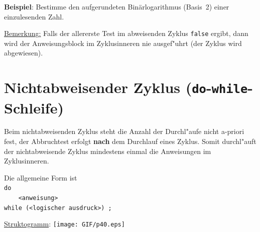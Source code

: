 \textbf{Beispiel}: Bestimme den aufgerundeten Binärlogarithmus (Basis~2)
einer einzulesenden Zahl.
%
% 


\underline{Bemerkung:} Falls der allererste Test im abweisenden Zyklus \texttt{false}
ergibt, dann wird der Anweisungsblock im Zyklusinneren
nie ausgef"uhrt (der Zyklus wird abgewiesen).

%
%
\section[Nichtabweisender Zyklus]{Nichtabweisender Zyklus (\texttt{do}-\texttt{while}-Schleife)}
\label{p:4.6}
%
Beim nichtabweisenden Zyklus steht die Anzahl der Durchl"aufe nicht
a-priori fest, der Abbruchtest erfolgt \textbf{nach} dem Durchlauf
eines Zyklus. Somit durchl"auft der nichtabweisende Zyklus mindestens
einmal die Anweisungen im Zyklusinneren.

% 
% 

\begin{minipage}[t]{0.5\textwidth}
Die allgemeine Form ist\\[1ex]
\phantom{XXX}\verb|do| \\
\phantom{XXX}\verb|    <anweisung>|\\
\phantom{XXX}\verb|while (<logischer ausdruck>) ;|
\end{minipage}
\begin{minipage}[t]{0.4\textwidth}
\underline{Struktogramm}: %
\texttt{[image: GIF/p40.eps]}
\end{minipage}



